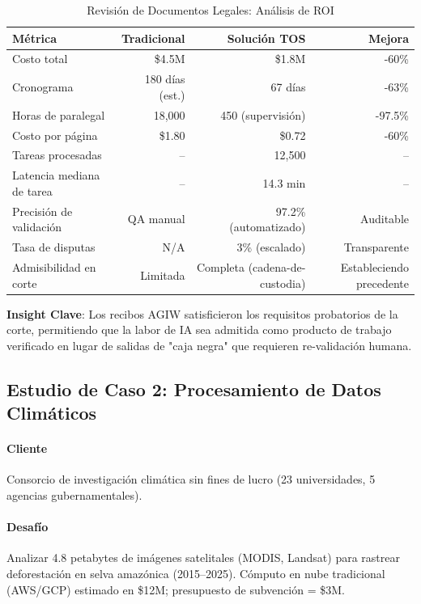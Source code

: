 \documentclass[11pt]{article}
\begin{document}
\begin{table}[H]
\centering
\caption{Revisión de Documentos Legales: Análisis de ROI}
\label{tab:legal-roi}
\begin{tabular}{@{}lrrr@{}}
\toprule
\textbf{Métrica} & \textbf{Tradicional} & \textbf{Solución TOS} & \textbf{Mejora} \\ \midrule
Costo total & \$4.5M & \$1.8M & -60\% \\
Cronograma & 180 días (est.) & 67 días & -63\% \\
Horas de paralegal & 18,000 & 450 (supervisión) & -97.5\% \\
Costo por página & \$1.80 & \$0.72 & -60\% \\
Tareas procesadas & -- & 12,500 & -- \\
Latencia mediana de tarea & -- & 14.3 min & -- \\
Precisión de validación & QA manual & 97.2\% (automatizado) & Auditable \\
Tasa de disputas & N/A & 3\% (escalado) & Transparente \\
Admisibilidad en corte & Limitada & Completa (cadena-de-custodia) & Estableciendo precedente \\
\bottomrule
\end{tabular}
\end{table}

\textbf{Insight Clave}: Los recibos AGIW satisficieron los requisitos probatorios de la corte, permitiendo que la labor de IA sea admitida como producto de trabajo verificado en lugar de salidas de "caja negra" que requieren re-validación humana.

\subsection{Estudio de Caso 2: Procesamiento de Datos Climáticos}

\paragraph{Cliente} Consorcio de investigación climática sin fines de lucro (23 universidades, 5 agencias gubernamentales).

\paragraph{Desafío} Analizar 4.8 petabytes de imágenes satelitales (MODIS, Landsat) para rastrear deforestación en selva amazónica (2015--2025). Cómputo en nube tradicional (AWS/GCP) estimado en \$12M; presupuesto de subvención = \$3M.
\end{document}
